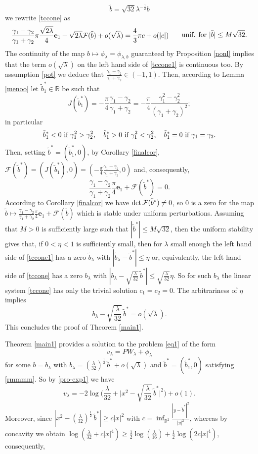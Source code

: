 \documentclass[reqno,11pt]{amsart}
\theoremstyle{definition}
\numberwithin{equation}{section}
\newcommand{\cal}{\mathcal }
\newcommand{\R}{\mathbb{R}}
\newcommand{\la}{\lambda}
\renewcommand{\(}{\left(}
\renewcommand{\)}{\right)}
\renewcommand{\[}{\left[}
\renewcommand{\]}{\right]}
\newcommand{\beq}{\begin{equation}}
\newcommand{\eeq}{\end{equation}}
\begin{document}
{$$\tilde b=\sqrt{32}\la^{-\frac12} b$$ we rewrite \eqref{tccone} as \beq\label{tccone1} \begin{aligned}\frac{\gamma_1-\gamma_2}{\gamma_1+\gamma_2}\pi\frac{\sqrt{2\la}}{4}{\mathbf e}_1+\sqrt{2\la}{\mathcal F}(\tilde b)+o(\sqrt\la)&= \frac{4}{3}\pi c+ o(|c|)
\end{aligned}\;\;\hbox{ unif. for }|\tilde b|\leq M\sqrt{32}.\eeq
The continuity of the map $b\mapsto \phi_\la=\phi_{\la,b}$ guaranteed by Proposition \ref{nonl}  implies that the term $o(\sqrt\la)$ on the left hand
side of \eqref{tccone1} is continuous too.  By assumption \eqref{pot} we deduce that  $\frac{\gamma_1-\gamma_2}{\gamma_1+\gamma_2}\in (-1,1)$. Then, according to Lemma \ref{menoo} let $\tilde b_1^*\in\R$ be such that $$J(\tilde b_1^*)= -\frac{\pi}{4}\frac{\gamma_1-\gamma_2}{\gamma_1+\gamma_2}=-\frac\pi4\frac{\gamma_1^2-\gamma_2^2}{(\gamma_1+\gamma_2)^2};$$ in particular \beq\label{rmmmm}\tilde b_1^*<0\hbox{ if } \gamma_1^2>\gamma_2^2,\quad \tilde b_1^*>0\hbox{ if } \gamma_1^2<\gamma_2^2,\quad\tilde b_1^*=0\hbox{ if }\gamma_1=\gamma_2.\eeq  Then, setting $\tilde b^*=(\tilde b^*_1,0)$, by Corollary \ref{finalcor}, ${\cal F}(\tilde b^*)=(J(\tilde b_1^*),0) =(-\frac\pi4\frac{\gamma_1-\gamma_2}{\gamma_1+\gamma_2},0) $ and, consequently,$$\frac{\gamma_1-\gamma_2}{\gamma_1+\gamma_2}\frac{\pi}{4}{\mathbf e}_1+{\mathcal F}(\tilde b^*)=0.$$  According to Corollary \ref{finalcor} we have  ${\rm det}\,{\cal F}(\tilde b^*)\neq  0$, so $0$ is a zero for the map $\tilde b\mapsto \frac{\gamma_1-\gamma_2}{\gamma_1+\gamma_2}\frac{\pi}{4}{\mathbf e}_1+{\cal F}(\tilde b)$ which is stable under uniform perturbations. Assuming that $M>0$ is sufficiently large such that $|\tilde b^*|\leq M\sqrt{32}$, then  the uniform stability gives that, if $0<\eta<1$  is sufficiently small,
then for $\la$ small enough the left hand side of \eqref{tccone1} has a zero $\tilde b_\la$ with $|\tilde b_\la-\tilde b^*|\leq \eta$ or, equivalently,
the left hand side of \eqref{tccone} has a zero $b_\la$ with $|b_\la-\sqrt{\frac{\la}{32}}\,\tilde b^*|\leq \sqrt{\frac{\la}{32}}\eta $. So for such $b_\la$  the linear system \eqref{tccone} has only the trivial solution $c_1=c_2=0$. The arbitrariness of $\eta$ implies $$b_\la-\sqrt{\frac{\la}{32}}\,\tilde b^* =o(\sqrt\la).$$ This concludes the proof of Theorem \ref{main1}.
 
\bigskip

Theorem \ref{main1} provides a solution to the  problem \eqref{eq1}  of the form $$v_\la=PW_\la+\phi_\la$$   for some $b=b_\la$ with $b_\la=(\frac{\la}{32})^{\frac12}\,\tilde b^*+o(\sqrt\la)$ and $\tilde b^*=(\tilde b^*_1,0)$ satisfying \eqref{rmmmm}. So  
  by \eqref{pro-exp1} we have $$v_\la= -2\log\bigg(\frac{\la}{32}+\bigg|x^2-\sqrt{\frac{\la}{32}}\,\tilde b^*\bigg|^2\bigg)+o(1).$$  
Moreover, since $|x^2-(\frac{\la}{32})^{\frac12}\,\tilde b^*|\geq c |x|^2$ with $c=\inf_{\R^2}\frac{|y-\tilde b^*|^2}{|y|^2}$, whereas  by concavity we obtain  $\log\(\frac{\la}{32}+c|x|^4\)\geq \frac12\log\(\frac{\la}{16}\)+\frac12\log (2c|x|^{4})$, consequently, 

}
\end{document}
